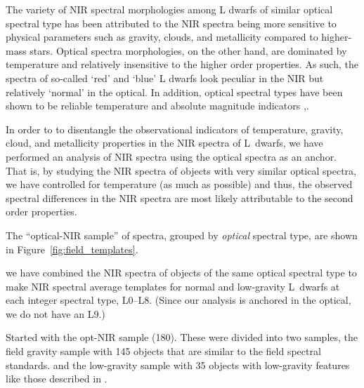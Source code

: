 \documentclass[12pt,preprint]{aastex}
\newcommand{\sample}{180}
\begin{document}
The variety of NIR spectral morphologies among L dwarfs of similar optical spectral type has been attributed to the NIR spectra being more sensitive to physical parameters such as gravity, clouds, and metallicity compared to higher-mass stars.
Optical spectra morphologies, on the other hand, are dominated by temperature and relatively insensitive to the higher order properties. As such, the spectra of so-called `red' and `blue' L dwarfs look peculiar in the NIR but relatively `normal' in the optical. 
In addition, optical spectral types have been shown to be reliable temperature and absolute magnitude indicators \cite[Figure 7 and 9]{Kirkpatrick05},\cite{Faherty:2012cy}. 

In order to to disentangle the observational indicators of temperature, gravity, cloud, and metallicity properties in the NIR spectra of L~dwarfs, we have performed an analysis of NIR spectra using the optical spectra as an anchor.
That is, by studying the NIR spectra of objects with very similar optical spectra, we have controlled for temperature (as much as possible) and thus, the observed spectral differences in the NIR spectra are most likely attributable to the second order properties.

The ``optical-NIR sample'' of spectra, grouped by \emph{optical} spectral type, are shown in Figure~\ref{fig:field_templates}. 

 we have combined the NIR spectra of objects of the same optical spectral type to make NIR spectral average templates for normal and low-gravity L~dwarfs at each integer spectral type, L0--L8. (Since our analysis is anchored in the optical, we do not have an L9.) 

Started with the opt-NIR sample (180). These were divided into two samples, the field gravity sample with 145 objects that are similar to the \citet{K99} field spectral standards.
 and the low-gravity sample with 35 objects with low-gravity features like those described in \citet{Cruz09_lowg}.
\end{document}

